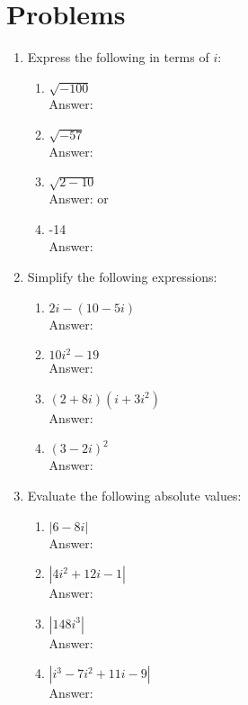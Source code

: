 \documentclass[12pt]{extarticle}
\begin{document}
\section{Problems}
\begin{enumerate}
    \itemsep 1.8em
    \item {Express the following in terms of $i$:
        \begin{enumerate}
            \itemsep 1.0em
            \item {$\sqrt{-100}$ \\Answer: }
            \item {$\sqrt{-57}$ \\Answer: }
            \item {$\sqrt{2-10}$ \\Answer:  or }
            \item {-14 \\Answer: }
        \end{enumerate}
    }
    \item {Simplify the following expressions:
        \begin{enumerate}
            \itemsep 1.0em
            \item {$2i - (10 - 5i)$ \\Answer: }
            \item {$10i^2 - 19$ \\Answer: }
            \item {$(2+8i)(i+3i^2)$ \\Answer: }
            \item {$(3-2i)^2$ \\Answer: }
        \end{enumerate}
    }
    \item {Evaluate the following absolute values:
        \begin{enumerate}
            \itemsep 1.0em
            \item {$|6-8i|$ \\Answer: }
            \item {$|4i^2+12i-1|$ \\Answer: }
            \item {$|148i^3|$ \\Answer: }
            \item {$|i^3-7i^2+11i-9|$ \\Answer: }

\end{enumerate}}
\end{enumerate}
\end{document}
